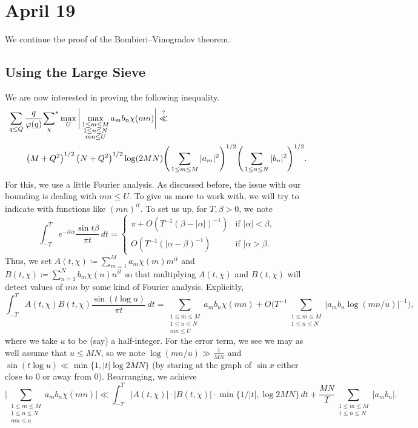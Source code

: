 \documentclass[../notes.tex]{subfiles}
\begin{document}
\section{April 19}

We continue the proof of the Bombieri--Vinogradov theorem.

\subsection{Using the Large Sieve}
We are now interested in proving the following inequality.
\begin{align}
	&\sum_{q\le Q}\frac q{\varphi(q)}{\sum_\chi}^*\max_U\bigg|\max_{\substack{1\le m\le M\\1\le n\le N\\mn\le U}}a_mb_n\chi(mn)\bigg| \stackrel?\ll \notag\\
	&\qquad\left(M+Q^2\right)^{1/2}\left(N+Q^2\right)^{1/2}\log(2MN)\Bigg(\sum_{1\le m\le M}|a_m|^2\Bigg)^{1/2}\Bigg(\sum_{1\le n\le N}|b_n|^2\Bigg)^{1/2}. \label{eq:large-sieve-ineq}
\end{align}
For this, we use a little Fourier analysis. As discussed before, the issue with our bounding is dealing with $mn\le U$. To give us more to work with, we will try to indicate with functions like $(mn)^{it}$. To set us up, for $T,\beta>0$, we note
\[\int_{-T}^Te^{-it\alpha}\frac{\sin t\beta}{\pi t}\,dt=\begin{cases}
	\pi+O\left(T^{-1}(\beta-|\alpha|)^{-1}\right) & \text{if }|\alpha|<\beta, \\
	O\left(T^{-1}(|\alpha-\beta)^{-1}\right) & \text{if }|\alpha>\beta.
\end{cases}\]
Thus, we set $A(t,\chi)\coloneqq\sum_{m=1}^Ma_m\chi(m)m^{it}$ and $B(t,\chi)\coloneqq\sum_{n=1}^Nb_m\chi(n)n^{it}$ so that multiplying $A(t,\chi)$ and $B(t,\chi)$ will detect values of $mn$ by some kind of Fourier analysis. Explicitly,
\[\int_{-T}^TA(t,\chi)B(t,\chi)\frac{\sin(t\log u)}{\pi t}\,dt=\sum_{\substack{1\le m\le M\\1\le n\le N\\mn\le U}}a_mb_n\chi(mn)+O\Bigg(T^{-1}\sum_{\substack{1\le m\le M\\1\le n\le N}}|a_mb_n\log(mn/u)|^{-1}\Bigg),\]
where we take $u$ to be (say) a half-integer. For the error term, we see we may as well assume that $u\le MN$, so we note $\log(mn/u)\gg\frac1{MN}$ and $\sin(t\log u)\ll\min\{1,|t|\log2MN\}$ (by staring at the graph of $\sin x$ either close to $0$ or away from $0$). Rearranging, we achieve
\[\Bigg|\sum_{\substack{1\le m\le M\\1\le n\le N\\mn\le u}}a_mb_n\chi(mn)\Bigg|\ll\int_{-T}^T|A(t,\chi)|\cdot|B(t,\chi)|\cdot\min\{1/|t|,\log2MN\}\,dt+\frac{MN}T\sum_{\substack{1\le m\le M\\1\le n\le N}}|a_mb_n|.\]
\end{document}
